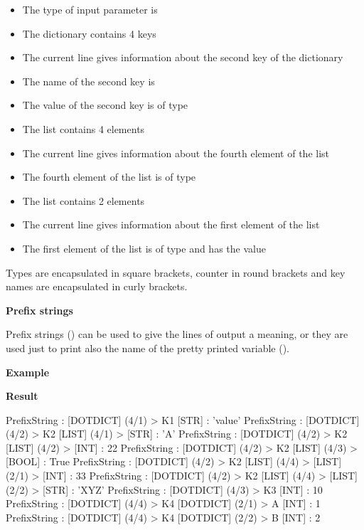 \begin{itemize}
   \item The type of input parameter  is 
   \item The dictionary contains 4 keys
   \item The current line gives information about the second key of the dictionary
   \item The name of the second key is 
   \item The value of the second key is of type 
   \item The list contains 4 elements
   \item The current line gives information about the fourth element of the list
   \item The fourth element of the list is of type 
   \item The list contains 2 elements
   \item The current line gives information about the first element of the list
   \item The first element of the list is of type  and has the value 
\end{itemize}

Types are encapsulated in square brackets, counter in round brackets and key names are encapsulated in curly brackets.

\newpage

\textbf{Prefix strings}

Prefix strings () can be used to give the lines of output a meaning, or they are used just to print also the name
of the pretty printed variable ().

\textbf{Example}


\textbf{Result}

\begin{robotlog}
PrefixString : [DOTDICT] (4/1) > {K1} [STR]  :  'value'
PrefixString : [DOTDICT] (4/2) > {K2} [LIST] (4/1) > [STR]  :  'A'
PrefixString : [DOTDICT] (4/2) > {K2} [LIST] (4/2) > [INT]  :  22
PrefixString : [DOTDICT] (4/2) > {K2} [LIST] (4/3) > [BOOL]  :  True
PrefixString : [DOTDICT] (4/2) > {K2} [LIST] (4/4) > [LIST] (2/1) > [INT]  :  33
PrefixString : [DOTDICT] (4/2) > {K2} [LIST] (4/4) > [LIST] (2/2) > [STR]  :  'XYZ'
PrefixString : [DOTDICT] (4/3) > {K3} [INT]  :  10
PrefixString : [DOTDICT] (4/4) > {K4} [DOTDICT] (2/1) > {A} [INT]  :  1
PrefixString : [DOTDICT] (4/4) > {K4} [DOTDICT] (2/2) > {B} [INT]  :  2
\end{robotlog}

